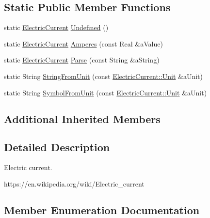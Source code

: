 \subsection*{Static Public Member Functions}
\begin{DoxyCompactItemize}
\item 
static \hyperlink{classlibrary_1_1physics_1_1units_1_1_electric_current}{Electric\+Current} \hyperlink{classlibrary_1_1physics_1_1units_1_1_electric_current_ae7de29cf2987692918a092a9fcbf209f}{Undefined} ()
\item 
static \hyperlink{classlibrary_1_1physics_1_1units_1_1_electric_current}{Electric\+Current} \hyperlink{classlibrary_1_1physics_1_1units_1_1_electric_current_a0ae1e07beb6c4dfcfa901714ff4dcb75}{Amperes} (const Real \&a\+Value)
\item 
static \hyperlink{classlibrary_1_1physics_1_1units_1_1_electric_current}{Electric\+Current} \hyperlink{classlibrary_1_1physics_1_1units_1_1_electric_current_acf532c6c33b8c8e580e062aa4d15b069}{Parse} (const String \&a\+String)
\item 
static String \hyperlink{classlibrary_1_1physics_1_1units_1_1_electric_current_adfc04e139353ede136d9dd4e0e256222}{String\+From\+Unit} (const \hyperlink{classlibrary_1_1physics_1_1units_1_1_electric_current_a9498eabf964f0ae6116eb627b4ec5233}{Electric\+Current\+::\+Unit} \&a\+Unit)
\item 
static String \hyperlink{classlibrary_1_1physics_1_1units_1_1_electric_current_a3caf9ff55162e8cec82de2cf654574d2}{Symbol\+From\+Unit} (const \hyperlink{classlibrary_1_1physics_1_1units_1_1_electric_current_a9498eabf964f0ae6116eb627b4ec5233}{Electric\+Current\+::\+Unit} \&a\+Unit)
\end{DoxyCompactItemize}
\subsection*{Additional Inherited Members}


\subsection{Detailed Description}
Electric current. 

https\+://en.wikipedia.\+org/wiki/\+Electric\+\_\+current 

\subsection{Member Enumeration Documentation}
\mbox{\label{classlibrary_1_1physics_1_1units_1_1_electric_current_a9498eabf964f0ae6116eb627b4ec5233}} 
